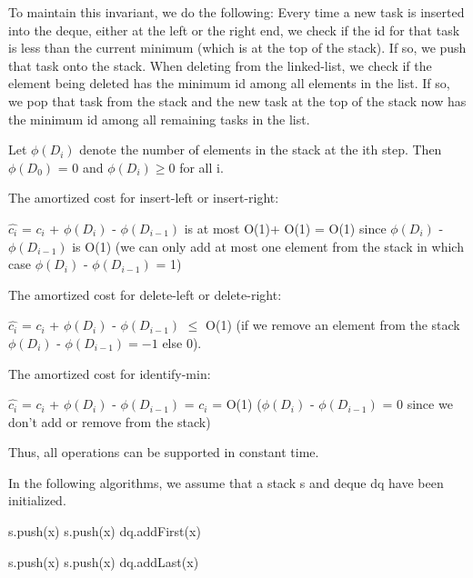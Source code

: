 \documentclass[11pt,a4paper]{article}
\begin{document}
To maintain this invariant, we do the following: Every time a new task is inserted into the deque, either at the left or the right end, we check if the id for that task is less than the current minimum (which is at the top of the stack). If so, we push that task onto the stack. When deleting from the linked-list, we check if the element being deleted has the minimum id among all elements in the list. If so, we pop that task from the stack and the new task at the top of the stack now has the minimum id among all remaining tasks in the list.


Let $\phi(D_{i})$ denote the number of elements in the stack at the ith step. Then $\phi(D_{0})$ = 0 and $\phi(D_{i}) \geq 0$ for all i.

The amortized cost for insert-left or insert-right:

$\hat{c_{i}}$ = $c_{i}$ + $\phi(D_{i})$ - $\phi(D_{i-1})$ is at most O(1)+ O(1) = O(1) since $\phi(D_{i})$ - $\phi(D_{i-1})$ is O(1) (we can only add at most one element from the stack in which case $\phi(D_{i})$ - $\phi(D_{i-1})$ = 1)

The amortized cost for delete-left or delete-right:

$\hat{c_{i}}$ = $c_{i}$ + $\phi(D_{i})$ - $\phi(D_{i-1})$ $\leq$ O(1) (if we remove an element from the stack $\phi(D_{i})$ - $\phi(D_{i-1}) = -1$ else 0).

The amortized cost for identify-min:

$\hat{c_{i}}$ = $c_{i}$ + $\phi(D_{i})$ - $\phi(D_{i-1})$ = $c_{i}$ = O(1) ($\phi(D_{i})$ - $\phi(D_{i-1})$ = 0 since we don't add or remove from the stack)

Thus, all operations can be supported in constant time.

 
In the following algorithms, we assume that a stack s and deque dq have been initialized.
\begin{algorithm}
	\begin{algorithmic}[1]
			\State s.push(x)
		\EndIf
	\Else {}   
		\State s.push(x)
	\EndIf
	\State dq.addFirst(x)
	\EndFunction
	\end{algorithmic}
	\end{algorithm}
	
\begin{algorithm}
	\begin{algorithmic}[1]
			\State s.push(x)
		\EndIf
	\Else {}   
		\State s.push(x)
	\EndIf
	\State dq.addLast(x)
	\EndFunction
	\end{algorithmic}
	\end{algorithm}
\end{document}
